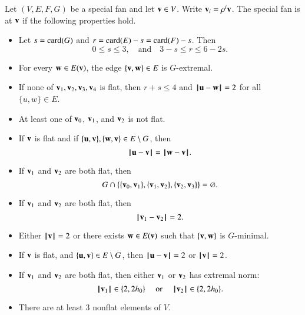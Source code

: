 \begin{definition}[irreducible]  Let $(V,E,F,G)$ be a special fan and let $\v\in V$.  
Write $\v_i  = \rho^i \v$.
The special fan is  at $\v$
if the following properties hold. 
\begin{itemize}
\item {} %
 Let      $s=\card(G)$ and $r=\card(E) - s = \card(F)-s$.  Then
$$0\le s \le 3,\quad\text{and}\quad3-s \le r \le 6 - 2s.$$
\item {} For every $\w\in E(\v)$,  the edge $\{\v,\w\}\in E$ is $G$-extremal.
\item {}  If none of $\v_1,\v_2,\v_3,\v_4$ is flat, then $r+s\le 4$
and $\norm{\u}{\w}=2$ for all $\{u,w\}\in E$.
\item {} At least one of $\v_0$, $\v_1$, and $\v_2$ is not flat.
\item {} If $\v$ is flat and if $\{\u,\v\},\{\w,\v\}\in E\setminus G$, then
$$
\norm{\u}{\v} = \norm{\w}{\v}.
$$
\item {} If $\v_1$ and $\v_2$ are both flat, then 
$$G\cap \{\{\v_0,\v_1\},\{\v_1,\v_2\},\{\v_2,\v_3\}\} = \emptyset.$$
\item {} If $\v_1$ and $\v_2$ are both flat, then
$$
\norm{\v_1}{\v_2} = 2.
$$
\item {} Either $\normo{\v}=2$ or there exists $\w\in E(\v)$ such
that $\{\v,\w\}$ is $G$-minimal.
\item {} If $\v$ is flat, and $\{\u,\v\}\in E\setminus G$, then
$\norm{\u}{\v}=2$ or $\normo{\v}=2$.
\item {} If $\v_1$ and $\v_2$ are both flat, then either $\v_1$ or $\v_2$
has extremal norm:
$$\normo{\v_1}\in \{2,2\hm\}\quad\text{ or }\quad \normo{\v_2}\in \{2,2\hm\}.$$
\item {} There are at least $3$ nonflat elements of $V$.
\end{itemize}
\end{definition}



